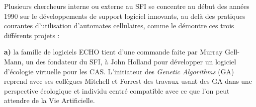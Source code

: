 %









Plusieurs chercheurs interne ou externe au SFI se concentre au début des années 1990 sur le développements de support logiciel innovants, au delà des pratiques courantes d'utilisation d'automates cellulaires, comme le démontre ces trois différents projets : 

\textbf{a)} la famille de logiciels ECHO tient d'une commande faite par Murray Gell-Mann, un des fondateur du SFI, à John Holland pour développer un logiciel d'écologie virtuelle pour les CAS. L'initiateur des \textit{Genetic Algorithms} (GA) reprend avec ses collègues Mitchell et Forrest des travaux usant des GA dans une perspective écologique et individu centré compatible avec ce que l'on peut attendre de la Vie Artificielle. \autocites{Holland1993, Mitchell1993, Smith2000}

